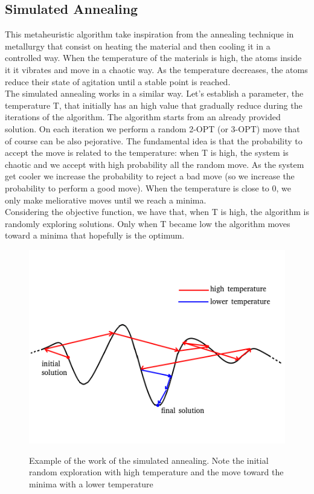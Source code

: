 \subsection{Simulated Annealing}
This metaheuristic algorithm take inspiration from the annealing technique in metallurgy that consist on heating the material and then cooling it in a controlled way. When the temperature of the materials is high, the atoms inside it it vibrates and move in a chaotic way. As the temperature decreases, the atoms reduce their state of agitation until a stable point is reached. \\
The simulated annealing works in a similar way. Let's establish a parameter, the temperature T, that initially has an high value that gradually reduce during the iterations of the algorithm. The algorithm starts from an already provided solution. On each iteration we perform a random 2-OPT (or 3-OPT) move that of course can be also pejorative. The fundamental idea is that the probability to accept the move is related to the temperature: when T is high, the system is chaotic and we accept with high probability all the random move. As the system get cooler we increase the probability to reject a bad move (so we increase the probability to perform a good move). When the temperature is close to 0, we only make meliorative moves until we reach a minima.\\
Considering the objective function, we have that, when T is high, the algorithm is randomly exploring solutions. Only when T became low the algorithm moves toward a minima that hopefully is the optimum.

\begin{figure}[h!]
\centering
	\includegraphics[scale=0.8]{media/SimulatedAnnealing.png} \\
	\caption{Example of the work of the simulated annealing. Note the initial random exploration with high temperature and the move toward the minima with a lower temperature}
\end{figure}

